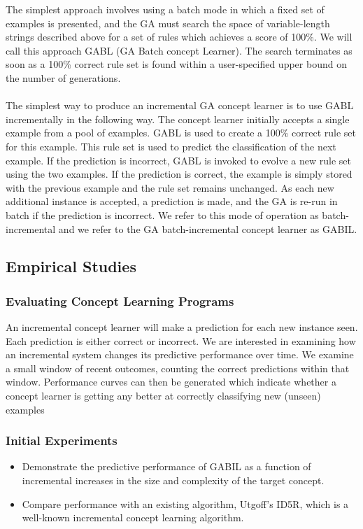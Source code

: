 \documentclass[../main.tex]{subfiles}
\begin{document}
The simplest approach involves using a batch mode in which a fixed set of examples is presented, and the GA must search
the space of variable-length strings described above for a set of rules which achieves a score of 100\%. We will call
this approach GABL (GA Batch concept Learner). The search terminates as soon as a 100\% correct rule set is found
within a user-specified upper bound on the number of generations.
\\\\
The simplest way to produce an incremental GA concept learner is to use GABL incrementally in the following way. The
concept learner initially accepts a single example from a pool of examples. GABL is used to create a 100\% correct rule
set for this example. This rule set is used to predict the classification of the next example. If the prediction is
incorrect, GABL is invoked to evolve a new rule set using the two examples. If the prediction is correct, the example
is simply stored with the previous example and the rule set remains unchanged. As each new additional instance is
accepted, a prediction is made, and the GA is re-run in batch if the prediction is incorrect. We refer to this mode of
operation as batch-incremental and we refer to the GA batch-incremental concept learner as GABIL.

\subsection{Empirical Studies}

\subsubsection{Evaluating Concept Learning Programs}
An incremental concept learner will make a prediction for each new instance seen. Each prediction is either correct or
incorrect. We are interested in examining how an incremental system changes its predictive performance over time. We
examine a small window of recent outcomes, counting the correct predictions within that window. Performance curves can
then be generated which indicate whether a concept learner is getting any better at correctly classifying new (unseen)
examples

\subsubsection{Initial Experiments}

\begin{itemize}
	\item Demonstrate the predictive performance of GABIL as a function of incremental increases in the size and
	complexity of the target concept.
	\item Compare performance with an existing algorithm, Utgoff’s ID5R, which is a well-known incremental concept
	learning algorithm.
\end{itemize}
\end{document}
